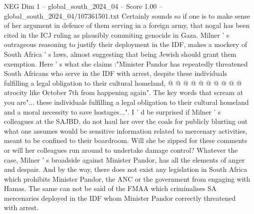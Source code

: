 \begin{textsample}{NEG Dim 1 – global\_south\_2024\_04 – Score 1.00 – global\_south\_2024\_04/107361501.txt}
Certainly sounds so if one is to make sense of her argument in defence of them serving in a foreign army, that nogal has been cited in the ICJ ruling as plausibly commiting genocide in Gaza.
Milner ' s outrageous reasoning to justify their deployment in the IDF, makes a mockery of South Africa ' s laws, almost suggesting that being Jewish should grant them exemption.
Here ' s what she claims :"Minister Pandor has repeatedly threatened South Africans who serve in the IDF with arrest, despite these individuals fulfilling a legal obligation to their cultural homeland, @ @ @ @ @ @ @ @ @ @ atrocity like October 7th from happening again".
The key words that scream at you are"... these individuals fulfilling a legal obligation to their cultural homeland and a moral necessity to save hostages...".
I ' d be surprised if Milner ' s colleagues at the SAJBD, do not haul her over the coals for publicly blurting out what one assumes would be sensitive information related to mercenary activities, meant to be confined to their boardroom.
Will she be zipped for these comments or will her colleagues run around to undertake damage control?
Whatever the case, Milner ' s broadside against Minister Pandor, has all the elements of anger and despair.
And by the way, there does not exist any legislation in South Africa which prohibits Minister Pandor, the ANC or the government from engaging with Hamas.
The same can not be said of the FMAA which criminalises SA mercenaries deployed in the IDF whom Minister Pandor correctly threatened with arrest.

\end{textsample}
